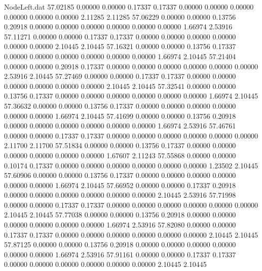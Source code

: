 \begin{filecontents}{NodeLeft.dat}
  57.02185    0.00000    0.00000     0.17337    0.17337    0.00000    0.00000    0.00000    0.00000    0.00000    0.00000    2.11285    2.11285
  57.06229    0.00000    0.00000     0.13756    0.20918    0.00000    0.00000    0.00000    0.00000    0.00000    0.00000    1.66974    2.53916
  57.11271    0.00000    0.00000     0.17337    0.17337    0.00000    0.00000    0.00000    0.00000    0.00000    0.00000    2.10445    2.10445
  57.16321    0.00000    0.00000     0.13756    0.17337    0.00000    0.00000    0.00000    0.00000    0.00000    0.00000    1.66974    2.10445
  57.21404    0.00000    0.00000     0.20918    0.17337    0.00000    0.00000    0.00000    0.00000    0.00000    0.00000    2.53916    2.10445
  57.27469    0.00000    0.00000     0.17337    0.17337    0.00000    0.00000    0.00000    0.00000    0.00000    0.00000    2.10445    2.10445
  57.32541    0.00000    0.00000     0.13756    0.17337    0.00000    0.00000    0.00000    0.00000    0.00000    0.00000    1.66974    2.10445
  57.36632    0.00000    0.00000     0.13756    0.17337    0.00000    0.00000    0.00000    0.00000    0.00000    0.00000    1.66974    2.10445
  57.41699    0.00000    0.00000     0.13756    0.20918    0.00000    0.00000    0.00000    0.00000    0.00000    0.00000    1.66974    2.53916
  57.46761    0.00000    0.00000     0.17337    0.17337    0.00000    0.00000    0.00000    0.00000    0.00000    0.00000    2.11700    2.11700
  57.51834    0.00000    0.00000     0.13756    0.17337    0.00000    0.00000    0.00000    0.00000    0.00000    0.00000    1.67607    2.11243
  57.55868    0.00000    0.00000     0.10174    0.17337    0.00000    0.00000    0.00000    0.00000    0.00000    0.00000    1.23502    2.10445
  57.60906    0.00000    0.00000     0.13756    0.17337    0.00000    0.00000    0.00000    0.00000    0.00000    0.00000    1.66974    2.10445
  57.66952    0.00000    0.00000     0.17337    0.20918    0.00000    0.00000    0.00000    0.00000    0.00000    0.00000    2.10445    2.53916
  57.71998    0.00000    0.00000     0.17337    0.17337    0.00000    0.00000    0.00000    0.00000    0.00000    0.00000    2.10445    2.10445
  57.77038    0.00000    0.00000     0.13756    0.20918    0.00000    0.00000    0.00000    0.00000    0.00000    0.00000    1.66974    2.53916
  57.82080    0.00000    0.00000     0.17337    0.17337    0.00000    0.00000    0.00000    0.00000    0.00000    0.00000    2.10445    2.10445
  57.87125    0.00000    0.00000     0.13756    0.20918    0.00000    0.00000    0.00000    0.00000    0.00000    0.00000    1.66974    2.53916
  57.91161    0.00000    0.00000     0.17337    0.17337    0.00000    0.00000    0.00000    0.00000    0.00000    0.00000    2.10445    2.10445

\end{filecontents}

